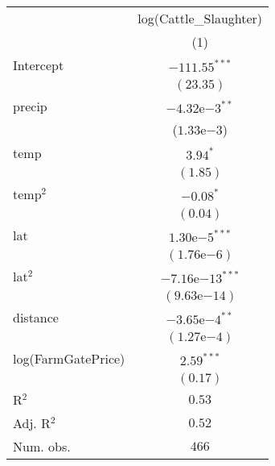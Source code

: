 
\begin{tabular}{l c}
\hline
 & log(Cattle\_Slaughter) \\
 & (1) \\
\hline
Intercept                                & $-111.55^{***}$ \\
                                          & $(23.35)$       \\
precip                             & $-4.32\mathrm{e}{-3}^{**}$    \\
                                                 & ($1.33\mathrm{e}{-3}$)        \\
temp                                & $3.94^{*}$      \\
                                                & $(1.85)$        \\
temp$^2$                              & $-0.08^{*}$     \\
                                                 & $(0.04)$        \\
lat                                               & $1.30\mathrm{e}{-5}^{***}$    \\
                                                   & $(1.76\mathrm{e}{-6})$        \\
lat$^2$                                            & $-7.16\mathrm{e}{-13}^{***}$   \\
                                                    & $(9.63\mathrm{e}{-14})$        \\
distance                                               & $-3.65\mathrm{e}{-4}^{**}$    \\
                                                       & $(1.27\mathrm{e}{-4})$        \\
log(FarmGatePrice)               & $2.59^{***}$    \\
                                                       & $(0.17)$        \\
\hline
R$^2$                                           & $0.53$          \\
Adj. R$^2$                                      & $0.52$          \\
Num. obs.                                        & $466$           \\
\hline

\end{tabular}

